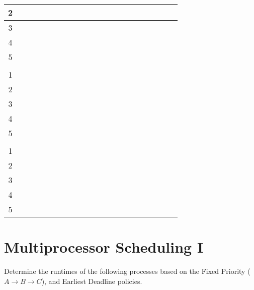 \documentclass{article}
\newcommand{\bc}{\cellcolor{blue!60}}
\newcommand{\blackc}{\cellcolor{black!}}
\newcommand{\blackrow}{
\blackc & \blackc & \blackc & \blackc & \blackc & \blackc & \blackc & \blackc & \blackc & \blackc & \blackc & \blackc & \blackc & \blackc & \blackc & \blackc & \blackc & \blackc & \blackc & \blackc & \blackc\\
\hline
}
\begin{document}
\begin{center}
\begin{tabular}{|c|c|c|c|c|c|c|c|c|c|c|c|c|c|c|c|c|c|c|c|c|}
\hline
2    &    &    &    &\bc&\bc&\bc&\bc&\bc&    &    &    &    &    &    &    &    &    &    &    &\\
\hline
3    &    &    &    &    &    &    &    &    &\bc&\bc&    &    &    &    &    &    &    &    &    &\\
\hline
4    &    &    &    &    &    &    &    &    &    &    &\bc&\bc&\bc&\bc&\bc&    &    &    &    &\\
\hline
5    &    &    &    &    &    &    &    &    &    &    &    &    &    &    &    &\bc&\bc&\bc&\bc&\bc\\
\hline
\blackrow
1    &\bc    &    &\bc    &    &    &    &\bc    &    &    &    &    &    &    &    &    &    &    &    &    &\\
\hline
2    &    &\bc    &    &    &\bc    &    &    &\bc    &\bc    &    &    &    &    &    &    &    &    &\bc    &    &\\
\hline
3    &    &    &    &\bc    &    &\bc    &    &    &    &    &    &    &    &    &    &    &    &    &    &\\
\hline
4    &    &    &    &    &    &    &    &    &    &\bc    &\bc    &\bc    &    &    &    &\bc    &    &    &\bc    &\\
\hline
5    &    &    &    &    &    &    &    &    &    &    &    &    &\bc    &\bc    &\bc    &    &\bc    &    &    &\bc\\
\hline
\blackrow
1    &\bc    &    &\bc    &\bc    &    &    &    &    &    &    &    &    &    &    &    &    &    &    &    &\\
\hline
2    &    &\bc    &    &    &    &\bc    &\bc    &    &\bc    &\bc    &    &    &    &    &    &    &    &    &    &\\
\hline
3    &    &    &    &    &\bc    &    &    &\bc    &    &    &    &    &    &    &    &    &    &    &    &\\
\hline
4    &    &    &    &    &    &    &    &    &    &    &\bc    &\bc    &\bc    &    &\bc    &\bc    &    &    &    &\\
\hline
5    &    &    &    &    &    &    &    &    &    &    &    &    &    &\bc    &    &    &\bc    &\bc    &\bc    &\bc\\
\hline
\end{tabular}
\end{center}
\newpage


\section{Multiprocessor Scheduling I}
Determine the runtimes of the following processes based on the Fixed Priority
($A\to B \to C$), and Earliest Deadline policies.
\end{document}
